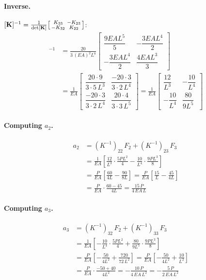 \documentclass[11pt, a4paper]{article}
\begin{document}
\paragraph{Inverse.}
$[\mathbf{K}]^{-1}=\frac{1}{\det[\mathbf{K}]}\begin{bsmallmatrix}K_{33}&-K_{23}\\-K_{32}&K_{22}\end{bsmallmatrix}$:
\begin{align*}
[\mathbf{K}]^{-1}
&= \frac{20}{3\,(EA)^2 L^8}\begin{bmatrix} \dfrac{9EAL^5}{5} & -\dfrac{3EAL^4}{2} \\[10pt] -\dfrac{3EAL^4}{2} & \dfrac{4EAL^3}{3} \end{bmatrix} \\[10pt]
&= \frac{1}{EA}\begin{bmatrix} \dfrac{20\cdot 9}{3\cdot 5\,L^3} & \dfrac{-20\cdot 3}{3\cdot 2\,L^4} \\[10pt] \dfrac{-20\cdot 3}{3\cdot 2\,L^4} & \dfrac{20\cdot 4}{3\cdot 3\,L^5} \end{bmatrix}
= \frac{1}{EA}\begin{bmatrix} \dfrac{12}{L^3} & -\dfrac{10}{L^4} \\[10pt] -\dfrac{10}{L^4} & \dfrac{80}{9L^5} \end{bmatrix}
\end{align*}

\paragraph{Computing $a_2$.}
\begin{align*}
a_2 &= (K^{-1})_{22}\,F_2+(K^{-1})_{23}\,F_3 \\[4pt]
    &= \frac{1}{EA}\!\left[\frac{12}{L^3}\cdot\frac{5PL^2}{4}
      -\frac{10}{L^4}\cdot\frac{9PL^3}{8}\right] \\[6pt]
    &= \frac{P}{EA}\!\left[\frac{60}{4L}-\frac{90}{8L}\right]
     = \frac{P}{EA}\!\left[\frac{15}{L}-\frac{45}{4L}\right] \\[6pt]
    &= \frac{P}{EA}\cdot\frac{60-45}{4L}
     = \frac{15\,P}{4\,EA\,L}
\end{align*}

\paragraph{Computing $a_3$.}
\begin{align*}
a_3 &= (K^{-1})_{32}\,F_2+(K^{-1})_{33}\,F_3 \\[4pt]
    &= \frac{1}{EA}\!\left[-\frac{10}{L^4}\cdot\frac{5PL^2}{4}
      +\frac{80}{9L^5}\cdot\frac{9PL^3}{8}\right] \\[6pt]
    &= \frac{P}{EA}\!\left[-\frac{50}{4L^2}+\frac{720}{72\,L^2}\right]
     = \frac{P}{EA}\!\left[-\frac{50}{4L^2}+\frac{10}{L^2}\right] \\[6pt]
    &= \frac{P}{EA}\cdot\frac{-50+40}{4L^2}
     = -\frac{10\,P}{4\,EA\,L^2}
     = -\frac{5\,P}{2\,EA\,L^2}
\end{align*}
\end{document}

